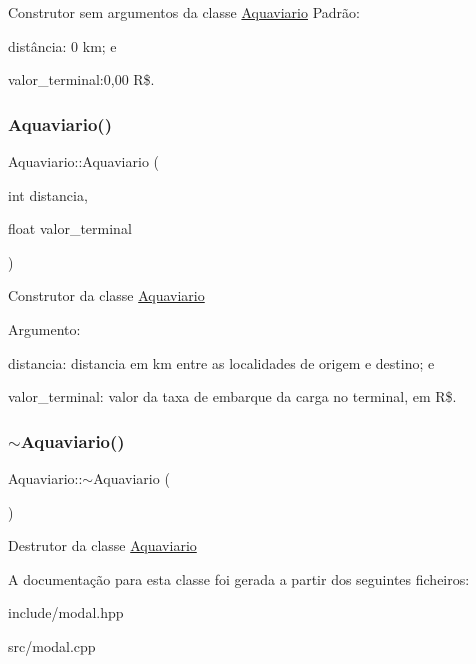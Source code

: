 Construtor sem argumentos da classe \hyperlink{classAquaviario}{Aquaviario} Padrão\+:
\begin{DoxyItemize}
\item distância\+: 0 km; e
\item valor\+\_\+terminal\+:0,00 R\$.
\end{DoxyItemize}\mbox{\label{classAquaviario_a331abedc032bba3076427a3e555dc6fd}} 
\subsubsection{\texorpdfstring{Aquaviario()}{Aquaviario()}\hspace{0.1cm}{\footnotesize\ttfamily [2/2]}}
{\footnotesize\ttfamily Aquaviario\+::\+Aquaviario (\begin{DoxyParamCaption}\item[{int}]{distancia,  }\item[{float}]{valor\+\_\+terminal }\end{DoxyParamCaption})}

Construtor da classe \hyperlink{classAquaviario}{Aquaviario}

Argumento\+:
\begin{DoxyItemize}
\item distancia\+: distancia em km entre as localidades de origem e destino; e
\item valor\+\_\+terminal\+: valor da taxa de embarque da carga no terminal, em R\$.
\end{DoxyItemize}\mbox{\label{classAquaviario_a71c1378131f32535dcad3e714e643c1d}} 
\subsubsection{\texorpdfstring{$\sim$\+Aquaviario()}{~Aquaviario()}}
{\footnotesize\ttfamily Aquaviario\+::$\sim$\+Aquaviario (\begin{DoxyParamCaption}{ }\end{DoxyParamCaption})}

Destrutor da classe \hyperlink{classAquaviario}{Aquaviario}

A documentação para esta classe foi gerada a partir dos seguintes ficheiros\+:\begin{DoxyCompactItemize}
\item 
include/modal.\+hpp\item 
src/modal.\+cpp\end{DoxyCompactItemize}
